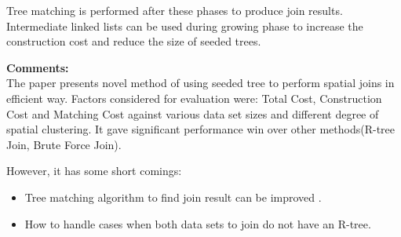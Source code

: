 \documentclass[a4paper,12pt, twoside]{article}
\begin{document}
Tree matching is performed after these phases to produce join results. Intermediate linked lists can be used during growing phase to increase the construction cost and reduce the size of seeded trees. 

\textbf{Comments:}\\
The paper presents novel method of using seeded tree to perform spatial joins in efficient way. Factors considered for evaluation were: Total Cost, Construction Cost and Matching Cost against various data set sizes and different degree of spatial clustering. It gave significant performance win over other methods(R-tree Join, Brute Force Join). 

However, it has some short comings:
\begin{itemize}
	\item Tree matching algorithm to find join result can be improved .
	
	\item How to handle cases when both data sets to join do not have an R-tree.

\end{itemize}
\end{document}

